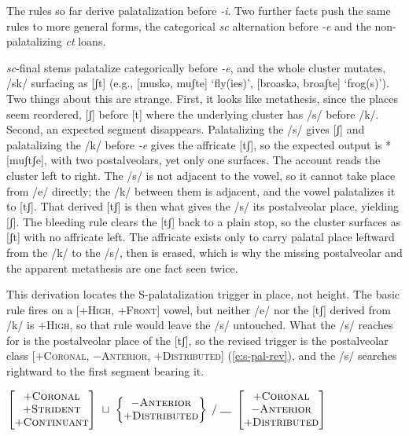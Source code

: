 \documentclass[11pt,letterpaper]{article}
\newcommand{\gap}{\rule{1em}{0.5pt}}
\newcommand{\word}[1]{\textit{#1}}
\newcommand{\featspec}[2]{\ensuremath{#1}\textsc{#2}}
\begin{document}

\bigskip\noindent
The rules so far derive palatalization before \word{-i}.
Two further facts push the same rules to more general forms, the categorical \word{sc} alternation before \word{-e} and the non-palatalizing \word{ct} loans.

\bigskip\noindent
\word{sc}-final stems palatalize categorically before \word{-e}, and the whole cluster mutates, /sk/ surfacing as [ʃt] (e.g., [muskə, muʃte] `fly(ies)', [broaskə, broaʃte] `frog(s)').
Two things about this are strange.
First, it looks like metathesis, since the places seem reordered, [ʃ] before [t] where the underlying cluster has /s/ before /k/.
Second, an expected segment disappears.
Palatalizing the /s/ gives [ʃ] and palatalizing the /k/ before \word{-e} gives the affricate [tʃ], so the expected output is *[muʃtʃe], with two postalveolars, yet only one surfaces.
The account reads the cluster left to right.
The /s/ is not adjacent to the vowel, so it cannot take place from /e/ directly; the /k/ between them is adjacent, and the vowel palatalizes it to [tʃ].
That derived [tʃ] is then what gives the /s/ its postalveolar place, yielding [ʃ].
The bleeding rule clears the [tʃ] back to a plain stop, so the cluster surfaces as [ʃt] with no affricate left.
The affricate exists only to carry palatal place leftward from the /k/ to the /s/, then is erased, which is why the missing postalveolar and the apparent metathesis are one fact seen twice.

\bigskip\noindent
This derivation locates the S-palatalization trigger in place, not height.
The basic rule fires on a [\featspec{+}{High}, \featspec{+}{Front}] vowel, but neither /e/ nor the [tʃ] derived from /k/ is \featspec{+}{High}, so that rule would leave the /s/ untouched.
What the /s/ reaches for is the postalveolar place of the [tʃ], so the revised trigger is the postalveolar class [\featspec{+}{Coronal}, \featspec{-}{Anterior}, \featspec{+}{Distributed}] (\ref{e:s-pal-rev}), and the /s/ searches rightward to the first segment bearing it.

\begin{unlabeledexample}
\small\hfill$\displaystyle
\begin{bmatrix}
\featspec{+}{Coronal}\\
\featspec{+}{Strident}\\
\featspec{+}{Continuant}
\end{bmatrix}
~\sqcup~
\begin{Bmatrix}
\featspec{-}{Anterior}\\
\featspec{+}{Distributed}
\end{Bmatrix}
\;/\;\gap~
\begin{bmatrix}
\featspec{+}{Coronal}\\
\featspec{-}{Anterior}\\
\featspec{+}{Distributed}
\end{bmatrix}
$\hfill\null
\label{e:s-pal-rev}
\end{unlabeledexample}
\end{document}
